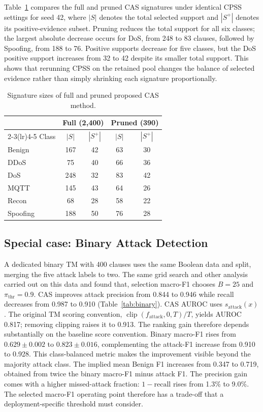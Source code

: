 \documentclass[conference]{IEEEtran}
\begin{document}
Table~\ref{tab:reduction} compares the full and pruned CAS signatures
under identical CPSS settings for seed 42, where $|S|$ denotes the
total selected support and $|S^+|$ denotes its positive-evidence subset.
Pruning reduces the total support for all six classes; the largest
absolute decrease occurs for DoS, from 248 to 83 clauses, followed by
Spoofing, from 188 to 76. Positive supports decrease for five classes,
but the DoS positive support increases from 32 to 42 despite its smaller
total support. This shows that rerunning CPSS on the retained pool
changes the balance of selected evidence rather than simply shrinking
each signature proportionally.

\begin{table}[!htb]
\centering
\caption{Signature sizes of full and pruned proposed CAS method.}
\label{tab:reduction}
\footnotesize
\begin{tabular}{@{}lcccc@{}}
\toprule
& \multicolumn{2}{c}{Full (2,400)} & \multicolumn{2}{c}{Pruned (390)} \\
\cmidrule(lr){2-3}\cmidrule(lr){4-5}
Class & $|S|$ & $|S^+|$ & $|S|$ & $|S^+|$ \\
\midrule
Benign & 167 & 42 & 63 & 30 \\
DDoS & 75 & 40 & 66 & 36 \\
DoS & 248 & 32 & 83 & 42 \\
MQTT & 145 & 43 & 64 & 26 \\
Recon & 68 & 28 & 58 & 22 \\
Spoofing & 188 & 50 & 76 & 28 \\
\bottomrule
\end{tabular}
\end{table}

\subsection{Special case: Binary Attack Detection}
\label{sec:binary}
A dedicated binary TM with 400 clauses uses the same Boolean data and split, merging the five
attack labels to two. The same grid search and other analysis carried out on this data and found that, selection macro-F1 chooses $B=25$ and
$\pi_{\mathrm{thr}}=0.9$. CAS improves attack precision from 0.844
to 0.946 while recall decreases from 0.987 to 0.910
(Table~\ref{tab:binary}). CAS AUROC uses $s_{\mathrm{attack}}(x)$.
The original TM scoring convention, $\operatorname{clip}
(f_{\mathrm{attack}},0,T)/T$, yields AUROC 0.817; removing clipping
raises it to 0.913. The ranking gain therefore depends substantially
on the baseline score convention.
Binary macro-F1 rises from $0.629\pm0.002$ to
$0.823\pm0.016$, complementing the attack-F1 increase from
0.910 to 0.928. This class-balanced metric makes the improvement
visible beyond the majority attack class.
The implied mean Benign F1 increases from 0.347 to 0.719, obtained
from twice the binary macro-F1 minus attack F1. The precision gain
comes with a higher missed-attack fraction: $1-\mathrm{recall}$ rises
from 1.3\% to 9.0\%. The selected macro-F1 operating point therefore
has a trade-off that a deployment-specific threshold must consider.
\end{document}
